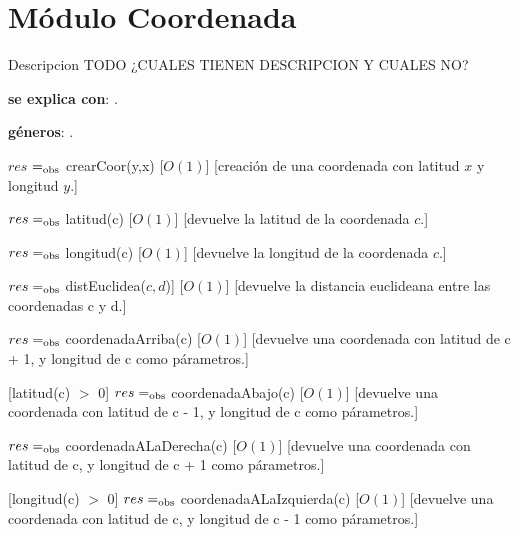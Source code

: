 \section{Módulo Coordenada}

Descripcion TODO ¿CUALES TIENEN DESCRIPCION Y CUALES NO?

\begin{Interfaz}

	\textbf{se explica con}: .

	\textbf{géneros}: .


	{$res$ $=_{\mathrm{obs}}$ crearCoor(y,x)}
	[$O(1)$]
	[creación de una coordenada con latitud $x$ y longitud $y$.]

	{$res =_{\mathrm{obs}}$ latitud(c)}
	[$O(1)$]
	[devuelve la latitud de la coordenada $c$.]

	{$res =_{\mathrm{obs}}$ longitud(c)}
	[$O(1)$]
	[devuelve la longitud de la coordenada $c$.]

	{$res =_{\mathrm{obs}}$ distEuclidea($c, d$)]}
	[$O(1)$]
	[devuelve la distancia euclideana entre las coordenadas c y d.]

	{$res =_{\mathrm{obs}}$ coordenadaArriba(c)}
	[$O(1)$]
	[devuelve una coordenada con latitud de c + 1, y longitud de c como párametros.]

	[latitud(c) $>$ 0]
	{$res =_{\mathrm{obs}}$ coordenadaAbajo(c)}
	[$O(1)$]
	[devuelve una coordenada con latitud de c - 1, y longitud de c como párametros.]

	{$res =_{\mathrm{obs}}$ coordenadaALaDerecha(c)}
	[$O(1)$]
	[devuelve una coordenada con latitud de c, y longitud de c + 1 como párametros.]

	[longitud(c) $>$ 0]
	{$res =_{\mathrm{obs}}$ coordenadaALaIzquierda(c)}
	[$O(1)$]
	[devuelve una coordenada con latitud de c, y longitud de c - 1 como párametros.]

\end{Interfaz}


